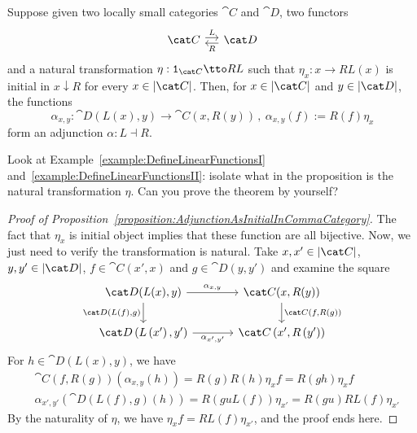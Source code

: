 \begin{proposition}\label{proposition:AdjunctionAsInitialInCommaCategory}
  Suppose given two locally small categories \(\cat C\) and
  \(\cat D\), two functors
  \[\begin{tikzcd}[column sep=small]
      \cat C \ar["L", r, shift left] & \cat D \ar["R", l, shift left]
    \end{tikzcd}\] and a natural transformation
  \(\eta : \id_{\cat C} \tto RL\) such that \(\eta_x : x \to RL(x)\)
  is initial in \(x {\downarrow} R\) for every \(x \in \obj{\cat C}\).
  Then, for \(x \in \obj{\cat C}\) and \(y \in \obj{\cat D}\), the
  functions
  \[\alpha_{x,y} : \cat D(L(x), y) \to \cat C(x, R(y)) \,,\
    \alpha_{x,y}(f) := R(f)\eta_x\] form an adjunction
  \(\alpha : L \dashv R\).
\end{proposition}

\begin{exercise}
  Look at Example~\ref{example:DefineLinearFunctionsI}
  and~\ref{example:DefineLinearFunctionsII}: isolate what in the
  proposition is the natural transformation \(\eta\). Can you prove
  the theorem by yourself?
\end{exercise}

\begin{proof}[Proof of Proposition~\ref{proposition:AdjunctionAsInitialInCommaCategory}]
  The fact that \(\eta_x\) is initial object implies that these
  function are all bijective. Now, we just need to verify the
  transformation is natural. Take \(x, x' \in \obj{\cat C}\),
  \(y, y' \in \obj{\cat D}\), \(f \in \cat C(x', x)\) and
  \(g \in \cat D(y, y')\) and examine the square
  \[\begin{tikzcd}[column sep=large]
      \cat D(L(x), y) \ar["{\cat D(L(f), g)}", d, swap] \ar["{\alpha_{x,y}}", r] & \cat C(x, R(y)) \ar["{\cat C(f, R(g))}", d] \\
      \cat D\left(L\left(x'\right), y'\right) \ar["{\alpha_{x',y'}}",
      r, swap] & \cat C\left(x', R\left(y'\right)\right)
    \end{tikzcd}\] For \(h \in \cat D(L(x), y)\), we have
  \begin{align*}
    & \cat C(f, R(g)) (\alpha_{x,y} (h)) = R(g) R(h) \eta_x f = R(gh) \eta_x f \\
    & \alpha_{x',y'} (\cat D (L(f), g)(h)) = R(guL(f)) \eta_{x'} = R(gu) RL(f) \eta_{x'}
  \end{align*}
  By the naturality of \(\eta\), we have
  \(\eta_x f = RL(f) \eta_{x'}\), and the proof ends here.
\end{proof}

